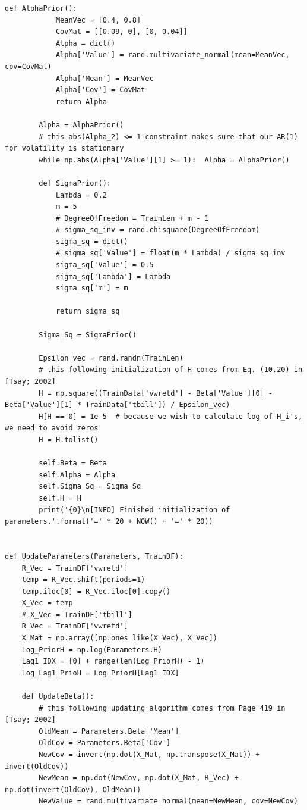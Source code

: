 \documentclass[letterpaper]{article}
\begin{document}
\begin{lstlisting}[label=lst:pythoncode]
        def AlphaPrior():
            MeanVec = [0.4, 0.8]
            CovMat = [[0.09, 0], [0, 0.04]]
            Alpha = dict()
            Alpha['Value'] = rand.multivariate_normal(mean=MeanVec, cov=CovMat)
            Alpha['Mean'] = MeanVec
            Alpha['Cov'] = CovMat
            return Alpha

        Alpha = AlphaPrior()
        # this abs(Alpha_2) <= 1 constraint makes sure that our AR(1) for volatility is stationary
        while np.abs(Alpha['Value'][1] >= 1):  Alpha = AlphaPrior()

        def SigmaPrior():
            Lambda = 0.2
            m = 5
            # DegreeOfFreedom = TrainLen + m - 1
            # sigma_sq_inv = rand.chisquare(DegreeOfFreedom)
            sigma_sq = dict()
            # sigma_sq['Value'] = float(m * Lambda) / sigma_sq_inv
            sigma_sq['Value'] = 0.5
            sigma_sq['Lambda'] = Lambda
            sigma_sq['m'] = m

            return sigma_sq

        Sigma_Sq = SigmaPrior()

        Epsilon_vec = rand.randn(TrainLen)
        # this following initialization of H comes from Eq. (10.20) in [Tsay; 2002]
        H = np.square((TrainData['vwretd'] - Beta['Value'][0] - Beta['Value'][1] * TrainData['tbill']) / Epsilon_vec)
        H[H == 0] = 1e-5  # because we wish to calculate log of H_i's, we need to avoid zeros
        H = H.tolist()

        self.Beta = Beta
        self.Alpha = Alpha
        self.Sigma_Sq = Sigma_Sq
        self.H = H
        print('{0}\n[INFO] Finished initialization of parameters.'.format('=' * 20 + NOW() + '=' * 20))


def UpdateParameters(Parameters, TrainDF):
    R_Vec = TrainDF['vwretd']
    temp = R_Vec.shift(periods=1)
    temp.iloc[0] = R_Vec.iloc[0].copy()
    X_Vec = temp
    # X_Vec = TrainDF['tbill']
    R_Vec = TrainDF['vwretd']
    X_Mat = np.array([np.ones_like(X_Vec), X_Vec])
    Log_PriorH = np.log(Parameters.H)
    Lag1_IDX = [0] + range(len(Log_PriorH) - 1)
    Log_Lag1_PrioH = Log_PriorH[Lag1_IDX]

    def UpdateBeta():
        # this following updating algorithm comes from Page 419 in [Tsay; 2002]
        OldMean = Parameters.Beta['Mean']
        OldCov = Parameters.Beta['Cov']
        NewCov = invert(np.dot(X_Mat, np.transpose(X_Mat)) + invert(OldCov))
        NewMean = np.dot(NewCov, np.dot(X_Mat, R_Vec) + np.dot(invert(OldCov), OldMean))
        NewValue = rand.multivariate_normal(mean=NewMean, cov=NewCov)


\end{lstlisting}
\end{document}
